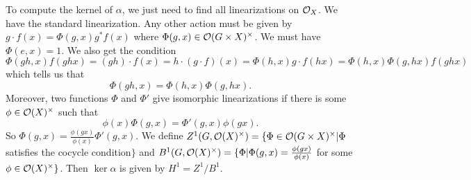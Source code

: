 To compute the kernel of $\alpha$, we just need to find all linearizations on $\mathcal{O}_X$. We have the standard linearization. Any other action must be given by $g\cdot f(x)= \Phi(g,x)g^*f(x)$ where $\Phi(g,x)\in \mathcal{O}(G\times X)^\times$. We must have $\Phi(e,x)=1$. We also get the condition
\[
 \Phi(gh,x)f(ghx)=(gh)\cdot f(x)=h\cdot (g\cdot f)(x)=\Phi(h,x)g\cdot f(hx)=\Phi(h,x)\Phi(g,hx)f(ghx)
\]
which tells us that
\[
 \Phi(gh,x)=\Phi(h,x)\Phi(g,hx).
\]
Moreover, two functions $\Phi$ and $\Phi'$ give isomorphic linearizations if there is some $\phi\in \mathcal{O}(X)^\times$ such that
\[
 \phi(x)\Phi(g,x)=\Phi'(g,x)\phi(gx).
\]
So $\Phi(g,x)=\frac{\phi(gx)}{\phi(x)}\Phi'(g,x)$. We define $Z^1(G,\mathcal{O}(X)^\times) = \{\Phi\in \mathcal{O}(G\times X)^\times|\Phi$ satisfies the cocycle condition$\}$ and $B^1(G,\mathcal{O}(X)^\times)=\{\Phi| \Phi(g,x)=\frac{\phi(gx)}{\phi(x)}$ for some $\phi\in \mathcal{O}(X)^\times\}$. Then $\ker \alpha$ is given by $H^1=Z^1/B^1$.
